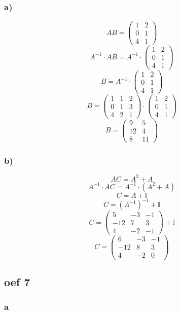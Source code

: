 \documentclass[10pt,a4paper]{article}
\begin{document}
\subsubsection*{a)}
$$ AB =
\begin{pmatrix}
1 & 2 \\
0 & 1 \\
4 & 1
\end{pmatrix}
$$
$$ A^{-1} \cdot AB = A^{-1} \cdot 
\begin{pmatrix}
1 & 2 \\
0 & 1 \\
4 & 1
\end{pmatrix}
$$
$$ B = A^{-1} \cdot
\begin{pmatrix}
1 & 2 \\
0 & 1 \\
4 & 1
\end{pmatrix}
$$
$$ B = 
\begin{pmatrix}
1 & 1 & 2 \\
0 & 1 & 3 \\
4 & 2 & 1
\end{pmatrix}
\cdot
\begin{pmatrix}
1 & 2 \\
0 & 1 \\
4 & 1
\end{pmatrix}
$$
$$ B = 
\begin{pmatrix}
9 & 5 \\
12 & 4 \\
8 & 11
\end{pmatrix}
$$
\subsubsection*{b)}
$$ AC = A^2 + A$$
$$ A^{-1} \cdot AC = A^{-1} \cdot (A^2 + A)$$
$$ C = A + \mathbb{I} $$
$$ C = (A^{-1})^{-1} + \mathbb{I} $$
$$ C = 
\begin{pmatrix}
5 & -3 & -1 \\
-12 & 7 & 3 \\
4 & -2 & -1
\end{pmatrix}
+ \mathbb{I} $$
$$ C = 
\begin{pmatrix}
6 & -3 & -1 \\
-12 & 8 & 3 \\
4 & -2 & 0
\end{pmatrix}
$$
\subsection*{oef 7}
\subsubsection*{a}
\end{document}
